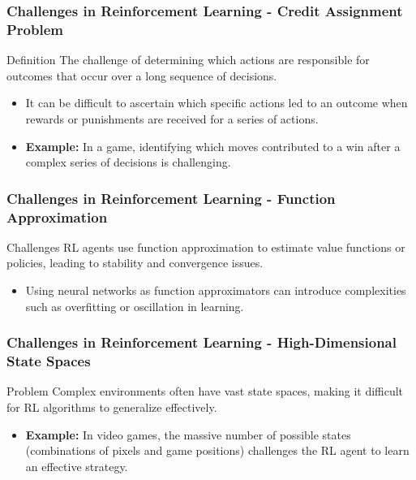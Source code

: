 \documentclass[aspectratio=169]{beamer}
\begin{document}
\begin{frame}[fragile]
    \frametitle{Challenges in Reinforcement Learning - Credit Assignment Problem}
    \begin{block}{Definition}
        The challenge of determining which actions are responsible for outcomes that occur over a long sequence of decisions.
    \end{block}
    \begin{itemize}
        \item It can be difficult to ascertain which specific actions led to an outcome when rewards or punishments are received for a series of actions.
        \item \textbf{Example:} In a game, identifying which moves contributed to a win after a complex series of decisions is challenging.
    \end{itemize}
\end{frame}

\begin{frame}[fragile]
    \frametitle{Challenges in Reinforcement Learning - Function Approximation}
    \begin{block}{Challenges}
        RL agents use function approximation to estimate value functions or policies, leading to stability and convergence issues.
    \end{block}
    \begin{itemize}
        \item Using neural networks as function approximators can introduce complexities such as overfitting or oscillation in learning.
    \end{itemize}
\end{frame}

\begin{frame}[fragile]
    \frametitle{Challenges in Reinforcement Learning - High-Dimensional State Spaces}
    \begin{block}{Problem}
        Complex environments often have vast state spaces, making it difficult for RL algorithms to generalize effectively.
    \end{block}
    \begin{itemize}
        \item \textbf{Example:} In video games, the massive number of possible states (combinations of pixels and game positions) challenges the RL agent to learn an effective strategy.
    \end{itemize}
\end{frame}
\end{document}
